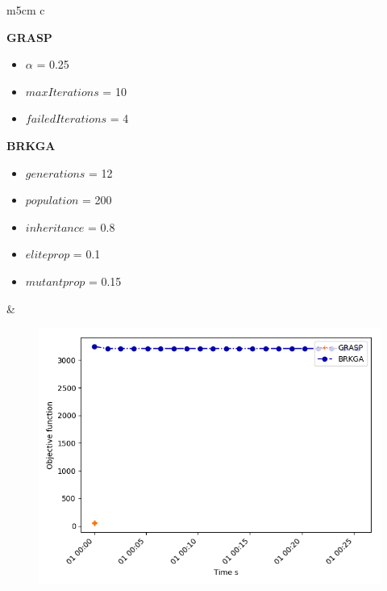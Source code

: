 \begin{table}[h!]
  \centering
  \begin{tabular}{ m{5cm}  c   }

  	\textbf{GRASP}
	\begin{itemize}
		\item $\alpha$ = 0.25
		\item $maxIterations$ = 10
		\item $failedIterations$ = 4
	\end{itemize}

	\textbf{BRKGA}
	\begin{itemize}
		\item $generations$ = 12
		\item $population$ = 200
		\item $inheritance$ = 0.8 
		\item $eliteprop$ = 0.1
		\item $mutantprop$ = 0.15
	\end{itemize}


	&

  	\begin{minipage}{\textwidth}
	\begin{subfigure}[b]{.8\linewidth}
	\includegraphics[width=0.8\linewidth]{./img/metah_comparison_objfunc.png}
	\end{subfigure}
	\end{minipage}


	 \\

  \end{tabular}
  \label{meta_comparison}
\end{table}


